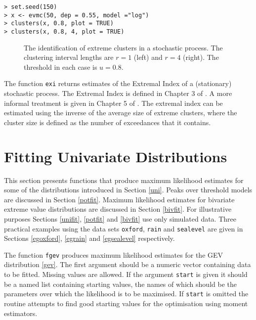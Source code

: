 \documentclass[11pt,a4paper]{article}
\begin{document}
\begin{verbatim}
> set.seed(150)
> x <- evmc(50, dep = 0.55, model ="log")
> clusters(x, 0.8, plot = TRUE)
> clusters(x, 0.8, 4, plot = TRUE)
\end{verbatim}

\begin{figure}
\begin{center}
\vspace{-1.5cm}
\hspace{0cm}
\end{center}
\vspace{0cm}
\caption{The identification of extreme clusters in a stochastic process. The clustering interval lengths are $r = 1$ (left) and $r=4$ (right). The threshold in each case is $u = 0.8$.}
\label{clust}
\end{figure}

The function \verb+exi+ returns estimates of the Extremal Index of a (stationary) stochastic process. The Extremal Index is defined in Chapter 3 of \citet{leadling83}. A more informal treatment is given in Chapter 5 of \citet{cole01}. The extremal index can be estimated using the inverse of the average size of extreme clusters, where the cluster size is defined as the number of exceedances that it contains. 

\section{Fitting Univariate Distributions}
\setcounter{footnote}{0}
\label{unifit}

This section presents functions that produce maximum likelihood estimates for some of the distributions introduced in Section \ref{uni}.
Peaks over threshold models are discussed in Section \ref{potfit}.
Maximum likelihood estimates for bivariate extreme value distributions are discussed in Section \ref{bivfit}.
For illustrative purposes Sections \ref{unifit}, \ref{potfit} and \ref{bivfit} use only simulated data.
Three practical examples using the data sets \verb+oxford+,
\verb+rain+ and \verb+sealevel+ are given in Sections \ref{egoxford},
\ref{egrain} and \ref{egsealevel} respectively.

The function \verb+fgev+ produces maximum likelihood estimates for the GEV distribution \eqref{gev}.
The first argument should be a numeric vector containing data to be fitted.
Missing values are allowed.
If the argument \verb+start+ is given it should be a named list containing starting values, the names of which should be the parameters over which the likelihood is to be maximised.
If \verb+start+ is omitted the routine attempts to find good starting values for the optimisation using moment estimators.
\end{document}
